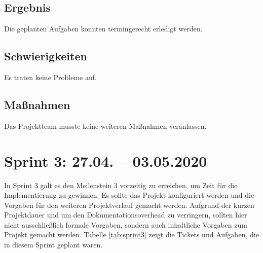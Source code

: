 \documentclass[a4paper,11pt,listof=numbered,glossary=totoc,parskip=half,toc=bib]{scrreprt}
\begin{document}
    \section{Ergebnis}
    Die geplanten Aufgaben konnten termingerecht erledigt werden.
    
    \section{Schwierigkeiten}
    Es traten keine Probleme auf. 
    
    \section{Maßnahmen}
    Das Projektteam musste keine weiteren Maßnahmen veranlassen.
	    
    \chapter{Sprint 3: 27.04. – 03.05.2020}

In Sprint 3 galt es den Meilenstein 3 vorzeitig zu erreichen, um Zeit für die Implementierung zu gewinnen. Es sollte das Projekt konfiguriert werden und die Vorgaben für den weiteren Projektverlauf gemacht werden. Aufgrund der kurzen Projektdauer und um den Dokumentationsoverhead zu verringern, sollten hier nicht ausschließlich formale Vorgaben, sondern auch inhaltliche Vorgaben zum Projekt gemacht werden. Tabelle \ref{tab:sprint3} zeigt die Tickets und Aufgaben, die in diesem Sprint geplant waren.
\end{document}
